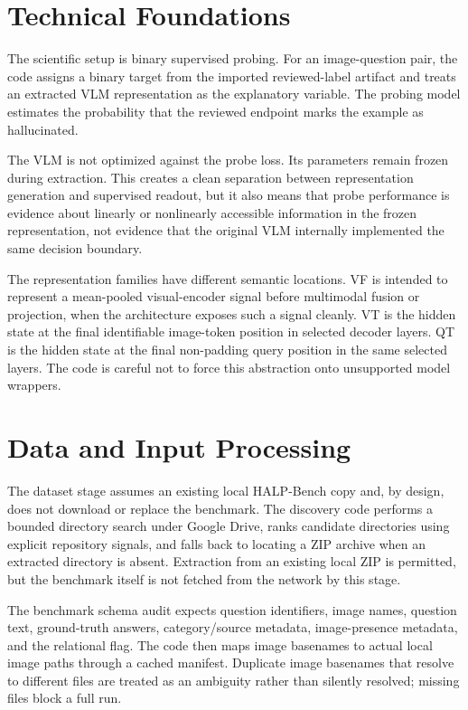 \documentclass[11pt,a4paper]{article}
\begin{document}
\section{Technical Foundations}

The scientific setup is binary supervised probing. For an image-question pair, the code assigns a binary target from the imported reviewed-label artifact and treats an extracted VLM representation as the explanatory variable. The probing model estimates the probability that the reviewed endpoint marks the example as hallucinated.

The VLM is not optimized against the probe loss. Its parameters remain frozen during extraction. This creates a clean separation between representation generation and supervised readout, but it also means that probe performance is evidence about linearly or nonlinearly accessible information in the frozen representation, not evidence that the original VLM internally implemented the same decision boundary.

The representation families have different semantic locations. VF is intended to represent a mean-pooled visual-encoder signal before multimodal fusion or projection, when the architecture exposes such a signal cleanly. VT is the hidden state at the final identifiable image-token position in selected decoder layers. QT is the hidden state at the final non-padding query position in the same selected layers. The code is careful not to force this abstraction onto unsupported model wrappers.

\section{Data and Input Processing}

The dataset stage assumes an existing local HALP-Bench copy and, by design, does not download or replace the benchmark. The discovery code performs a bounded directory search under Google Drive, ranks candidate directories using explicit repository signals, and falls back to locating a ZIP archive when an extracted directory is absent. Extraction from an existing local ZIP is permitted, but the benchmark itself is not fetched from the network by this stage.

The benchmark schema audit expects question identifiers, image names, question text, ground-truth answers, category/source metadata, image-presence metadata, and the relational flag. The code then maps image basenames to actual local image paths through a cached manifest. Duplicate image basenames that resolve to different files are treated as an ambiguity rather than silently resolved; missing files block a full run.
\end{document}
